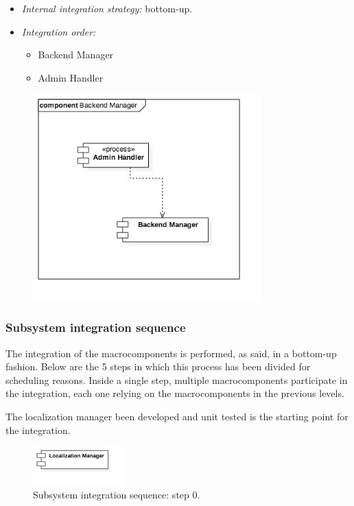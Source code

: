 			\begin{itemize}[label={},leftmargin=*,noitemsep,topsep=0pt]
				\item \textit{Internal integration strategy:} bottom-up.
				\item \textit{Integration order:}
					\begin{itemize}[noitemsep]
						\item Backend Manager
						\item Admin Handler
					\end{itemize}
			\end{itemize}
			\begin{figure}[h]
				\includegraphics[width=250pt, center]{img/integration_strategy/subcomponents/backend_manager.png}
			\end{figure}
		\FloatBarrier

	\subsubsection{Subsystem integration sequence}
	\label{sec:subsystem_integration_sequence}
		The integration of the macrocomponents is performed, as said, in a bottom-up fashion. Below are the 5 steps in which this process has been divided for scheduling reasons. Inside a single step, multiple macrocomponents participate in the integration, each one relying on the macrocomponents in the previous levels.

			The localization manager been developed and unit tested is the starting point for the integration.
			\begin{figure}[h]
				\includegraphics[width=100pt,center]{img/integration_strategy/steps/high_level_components_lv0.png}
				\caption{Subsystem integration sequence: step 0.}
			\end{figure}
		\FloatBarrier

